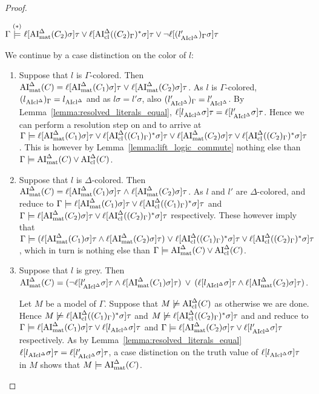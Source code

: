 \documentclass[,%
	draft=false,%
	numbers=noendperiod
	11pt,
	a4paper,
	oneside,%
	openany,
]{memoir}
\begin{document}
\begin{proof}
\begin{description}
			$\Gamma \stackrel{(*)}{\models} \ell[\operatorname{AI}_\mathrm{mat}^\Delta(C_2)\sigma]\tau \lor \ell[\operatorname{AI}_\mathrm{cl}^\Delta((C_2)_\Gamma)^*\sigma]\tau \lor \lnot \ell[(l{_{\operatorname{AIcl}^\Delta}'})_\Gamma\sigma]\tau$

			We continue by a case distinction on the color of $l$:
			\begin{enumerate}
				\item Suppose that $l$ is $\Gamma$-colored. Then $\operatorname{AI}_\mathrm{mat}^\Delta(C) = \ell[\operatorname{AI}_\mathrm{mat}^\Delta(C_1)\sigma]\tau\;{\lor}\; \ell[\operatorname{AI}_\mathrm{mat}^\Delta(C_2)\sigma]\tau$.
					As $l$ is $\Gamma$-colored, $(l{_{\operatorname{AIcl}^\Delta}})_\Gamma = l_{\operatorname{AIcl}^\Delta}$ and
					as $l\sigma = l'\sigma$, also $(l{_{\operatorname{AIcl}^\Delta}'})_\Gamma = l'_{\operatorname{AIcl}^\Delta}$.
					By Lemma~\ref{lemma:resolved_literals_equal}, $\ell[l{_{\operatorname{AIcl}^\Delta}}\sigma]\tau = \ell[l{_{\operatorname{AIcl}^\Delta}'}\sigma]\tau$.
					Hence we can perform a resolution step on \markA{} and \markB{} to arrive at
					$\Gamma \models \ell[\operatorname{AI}_\mathrm{mat}^\Delta(C_1)\sigma]\tau \lor \ell[\operatorname{AI}_\mathrm{cl}^\Delta((C_1)_\Gamma)^*\sigma]\tau
					\lor \ell[\operatorname{AI}_\mathrm{mat}^\Delta(C_2)\sigma]\tau \lor \ell[\operatorname{AI}_\mathrm{cl}^\Delta((C_2)_\Gamma)^*\sigma]\tau$.
					This is however by Lemma~\ref{lemma:lift_logic_commute} nothing else than $\Gamma \models \operatorname{AI}_\mathrm{mat}^\Delta(C) \lor \operatorname{AI}_\mathrm{cl}^\Delta(C)$.

				\item Suppose that $l$ is $\Delta$-colored. Then $\operatorname{AI}_\mathrm{mat}^\Delta(C) = \ell[\operatorname{AI}_\mathrm{mat}^\Delta(C_1)\sigma]\tau\;{\land}\; \ell[\operatorname{AI}_\mathrm{mat}^\Delta(C_2)\sigma]\tau$.
					As $l$ and $l'$ are $\Delta$-colored, \markA{} and \markB{} reduce to
					$\Gamma \models \ell[\operatorname{AI}_\mathrm{mat}^\Delta(C_1)\sigma]\tau \lor \ell[\operatorname{AI}_\mathrm{cl}^\Delta((C_1)_\Gamma)^*\sigma]\tau $ and
					$\Gamma \models \ell[\operatorname{AI}_\mathrm{mat}^\Delta(C_2)\sigma]\tau \lor \ell[\operatorname{AI}_\mathrm{cl}^\Delta((C_2)_\Gamma)^*\sigma]\tau $ respectively.
					These however imply that
					$\Gamma \models (\ell[\operatorname{AI}_\mathrm{mat}^\Delta(C_1)\sigma]\tau \land  \ell[\operatorname{AI}_\mathrm{mat}^\Delta(C_2)\sigma]\tau) \;{\lor}\;\allowbreak \ell[\operatorname{AI}_\mathrm{cl}^\Delta((C_1)_\Gamma)^*\sigma]\tau \lor \ell[\operatorname{AI}_\mathrm{cl}^\Delta((C_2)_\Gamma)^*\sigma]\tau$,
					which in turn is nothing else than $\Gamma \entails\nolinebreak \AImatde(C) \lor \AIclde(C)$.

				\item Suppose that $l$ is grey. Then $\operatorname{AI}_\mathrm{mat}^\Delta(C) =
					(\lnot {\ell[l'\ensuremath{_{\operatorname{AIcl}^\Delta}}\sigma]}\tau \land \ell[\operatorname{AI}_\mathrm{mat}^\Delta(C_1)\sigma]\tau) \;\,{\lor}\;\,\allowbreak
					(\ell[l_{\operatorname{AIcl}^\Delta}\sigma]\tau \land \ell[\operatorname{AI}_\mathrm{mat}^\Delta(C_2)\sigma]\tau)
					$.

					Let $M$ be a model of $\Gamma$. Suppose that $M \not\models \operatorname{AI}_\mathrm{cl}^\Delta(C)$ as otherwise we are done. Hence $M \not\models \ell[\operatorname{AI}_\mathrm{cl}^\Delta((C_1)_\Gamma)^*\sigma]\tau$ and $M \not\models \ell[\operatorname{AI}_\mathrm{cl}^\Delta((C_2)_\Gamma)^*\sigma]\tau$ and \markA{} and \markB{} reduce to
					$\Gamma \models \ell[\operatorname{AI}_\mathrm{mat}^\Delta(C_1)\sigma]\tau \lor \ell[l{_{\operatorname{AIcl}^\Delta}}\sigma]\tau$
					and
					$\Gamma \models \ell[\operatorname{AI}_\mathrm{mat}^\Delta(C_2)\sigma]\tau \lor \ell[l{_{\operatorname{AIcl}^\Delta}'}\sigma]\tau$ respectively.
					As by Lemma~\ref{lemma:resolved_literals_equal} $\ell[l{_{\operatorname{AIcl}^\Delta}}\sigma]\tau = \ell[l{_{\operatorname{AIcl}^\Delta}'}\sigma]\tau$, a case distinction on the truth value of $\ell[l{_{\operatorname{AIcl}^\Delta}}\sigma]\tau$ in $M$ shows that $M\models \operatorname{AI}_\mathrm{mat}^\Delta(C)$.



\end{enumerate}
\end{description}
\end{proof}
\end{document}
